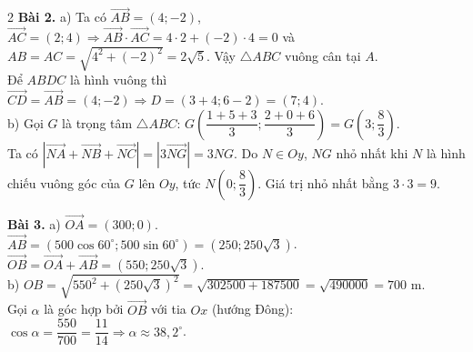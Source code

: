 \documentclass[10pt,a4paper]{article}
\begin{document}
\begin{multicols}{2}
\textbf{Bài 2.}
a) Ta có $\vec{AB} = (4; -2)$, $\vec{AC} = (2; 4) \Rightarrow \vec{AB}\cdot\vec{AC} = 4\cdot 2 + (-2)\cdot 4 = 0$ và $AB = AC = \sqrt{4^2 + (-2)^2} = 2\sqrt{5}$. Vậy $\triangle ABC$ vuông cân tại $A$.\\
Để $ABDC$ là hình vuông thì $\vec{CD} = \vec{AB} = (4; -2) \Rightarrow D = (3 + 4; 6 - 2) = (7; 4)$.\\
b) Gọi $G$ là trọng tâm $\triangle ABC$: $G\left(\dfrac{1 + 5 + 3}{3}; \dfrac{2 + 0 + 6}{3}\right) = G\left(3; \dfrac{8}{3}\right)$.\\
Ta có $|\vec{NA} + \vec{NB} + \vec{NC}| = |3\vec{NG}| = 3NG$. Do $N \in Oy$, $NG$ nhỏ nhất khi $N$ là hình chiếu vuông góc của $G$ lên $Oy$, tức $N\!\left(0; \dfrac{8}{3}\right)$. Giá trị nhỏ nhất bằng $3 \cdot 3 = 9$.

\textbf{Bài 3.}
a) $\vec{OA} = (300; 0)$.\\
$\vec{AB} = (500\cos 60^\circ; 500\sin 60^\circ) = (250; 250\sqrt{3})$.\\
$\vec{OB} = \vec{OA} + \vec{AB} = (550; 250\sqrt{3})$.\\
b) $OB = \sqrt{550^2 + (250\sqrt{3})^2} = \sqrt{302500 + 187500} = \sqrt{490000} = 700\text{ m}$.\\
Gọi $\alpha$ là góc hợp bởi $\vec{OB}$ với tia $Ox$ (hướng Đông): $\cos\alpha = \dfrac{550}{700} = \dfrac{11}{14} \Rightarrow \alpha \approx 38{,}2^\circ$.

\end{multicols}
\end{document}

